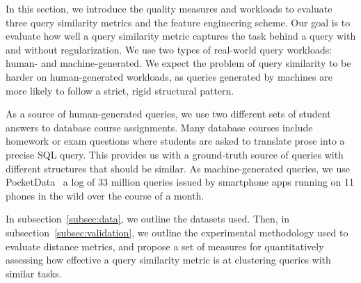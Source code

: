 In this section, we introduce the quality measures and workloads to evaluate three query similarity metrics and the feature engineering scheme.
Our goal is to evaluate how well a query similarity metric captures the task behind a query with and without regularization.
We use two types of real-world query workloads: human- and machine-generated.  
We expect the problem of query similarity to be harder on human-generated workloads, as queries generated by machines are more likely to follow a strict, rigid structural pattern.

As a source of human-generated queries, we use two different sets of student answers to database course assignments.
Many database courses include homework or exam questions where students are asked to translate prose into a precise SQL query.  
This provides us with a ground-truth source of queries with different structures that should be similar.
As machine-generated queries, we use PocketData~\cite{pocketdata} a log of 33 million queries issued by smartphone apps running on 11 phones in the wild over the course of a month.

In subsection~\ref{subsec:data}, we outline the datasets used.
Then, in subsection~\ref{subsec:validation}, we outline the experimental methodology used to evaluate distance metrics, and propose a set of measures for quantitatively assessing how effective a query similarity metric is at clustering queries with similar tasks.


